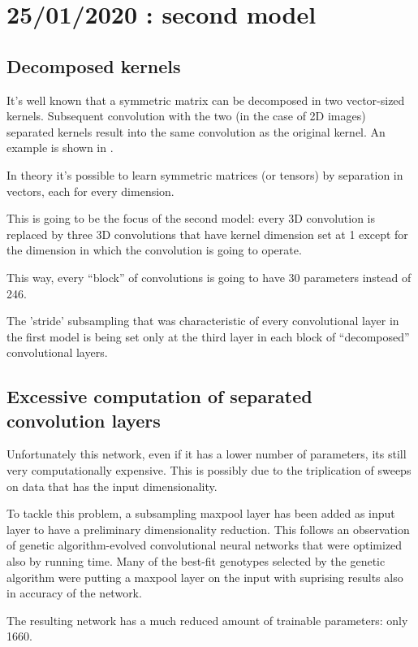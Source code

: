 \section{25/01/2020 : second model}

\subsection{Decomposed kernels}

It's well known that a symmetric matrix can be decomposed in two vector-sized kernels.
Subsequent convolution with the two (in the case of 2D images) separated kernels
result into the same convolution as the original kernel.
An example is shown in \cite{Sobel}.

In theory it's possible to learn symmetric matrices (or tensors) by separation
in vectors, each for every dimension.

This is going to be the focus of the second model: every 3D convolution is
replaced by three 3D convolutions that have kernel dimension set at 1 except for the
dimension in which the convolution is going to operate.

This way, every ``block'' of convolutions is going to have 30 parameters instead of 246.

The 'stride' subsampling that was characteristic of every convolutional layer
in the first model is being set only at the third layer in each block of
``decomposed'' convolutional layers.

\subsection{Excessive computation of separated convolution layers}

Unfortunately this network, even if it has a lower number of parameters,
its still very computationally expensive.
This is possibly due to the triplication of sweeps on data that has the input 
dimensionality.

To tackle this problem, a subsampling maxpool layer has been added as input layer to
have a preliminary dimensionality reduction.
This follows an observation of genetic algorithm-evolved convolutional neural networks
that were optimized also by running time.
Many of the best-fit genotypes selected by the genetic algorithm
were putting a maxpool layer
on the input with suprising results also in accuracy of the network.

The resulting network has a much reduced amount of trainable parameters: only 1660.

